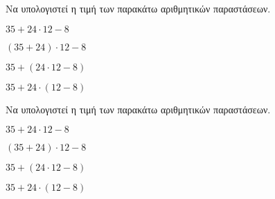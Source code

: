 Να υπολογιστεί η τιμή των παρακάτω αριθμητικών παραστάσεων.
\begin{multicols}{2}
\begin{rlist}
\item $ 35+24\cdot12-8 $
\item $ \left(35+24\right) \cdot12-8 $
\item $ 35+\left( 24\cdot12-8\right)  $
\item $ 35+24\cdot\left( 12-8\right)  $
\end{rlist}
\end{multicols}
Να υπολογιστεί η τιμή των παρακάτω αριθμητικών παραστάσεων.
\begin{multicols}{2}
\begin{rlist}
\item $ 35+24\cdot12-8 $
\item $ \left(35+24\right) \cdot12-8 $
\item $ 35+\left( 24\cdot12-8\right)  $
\item $ 35+24\cdot\left( 12-8\right)  $
\end{rlist}
\end{multicols}
